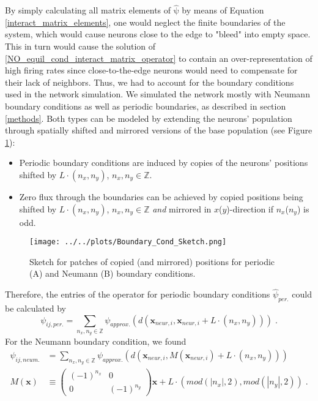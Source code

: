 \documentclass[10pt,a4paper]{article}
\begin{document}
By simply calculating all matrix elements of $\mathrm{\hat{\psi}}$ by means of Equation \eqref{interact_matrix_elements}, one would neglect the finite boundaries of the system, which would cause neurons close to the edge to "bleed" into empty space. This in turn would cause the solution of \eqref{NO_equil_cond_interact_matrix_operator} to contain an over-representation of high firing rates since close-to-the-edge neurons would need to compensate for their lack of neighbors. Thus, we had to account for the boundary conditions used in the network simulation. We simulated the network mostly with Neumann boundary conditions as well as periodic boundaries, as described in section \ref{methods}. Both types can be modeled by extending the neurons' population through spatially shifted and mirrored versions of the base population (see Figure \ref{Bound_Cond_Patches}):
\begin{itemize}
\item Periodic boundary conditions are induced by copies of the neurons' positions shifted by $L\cdot (n_x,n_y)$, $n_x,n_y \in \mathbb{Z}$.
\item Zero flux through the boundaries can be achieved by copied positions being shifted by $L\cdot (n_x,n_y)$, $n_x,n_y \in \mathbb{Z}$ \textit{and} mirrored in $x$($y$)-direction if $n_x$($n_y$) is odd.
\end{itemize}
\begin{figure}
\begin{center}
\texttt{[image: ../../plots/Boundary\_Cond\_Sketch.png]}
\end{center}
\caption{Sketch for patches of copied (and mirrored) positions for periodic (A) and Neumann (B) boundary conditions.}
\label{Bound_Cond_Patches}
\end{figure}
Therefore, the entries of the operator for periodic boundary conditions $\hat{\psi}_{per.}$ could be calculated by
\begin{equation}
\psi_{ij,per.} = \sum_{n_x,n_y \in \mathbb{Z}} \psi_{approx.} (d(\mathbf{x}_{neur,i},\mathbf{x}_{neur,i} + L \cdot (n_x,n_y))) \; .
\label{Psi_entries_periodic_bound}
\end{equation}
For the Neumann boundary condition, we found
\begin{align}
\psi_{ij,neum.} &= \sum_{n_x,n_y \in \mathbb{Z}} \psi_{approx.} \left( d(\mathbf{x}_{neur,i},M(\mathbf{x}_{neur,i}) + L \cdot (n_x,n_y)) \right) \label{Psi_entries_neumann_bound} \\
M(\mathbf{x}) &\equiv  
 \begin{pmatrix}
  (-1)^{n_x} & 0\\
  0 & (-1)^{n_y}
 \end{pmatrix}
\mathbf{x} + L \cdot (mod(\left| n_x\right|,2),mod(\left| n_y\right|,2)) \; . \label{Mirror_Operator}
\end{align}
\end{document}
